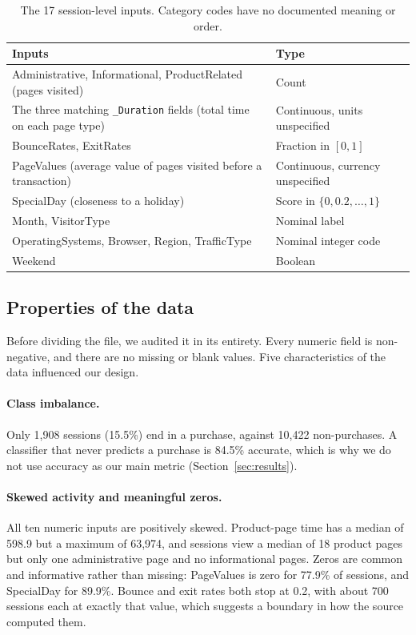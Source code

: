 \documentclass[11pt]{article}
\begin{document}
\begin{table}[t]
  \centering
  \small
  \begin{tabular}{>{\raggedright\arraybackslash}p{}>{\raggedright\arraybackslash}p{}}
    \hline
    \textbf{Inputs} & \textbf{Type} \\
    \hline
    Administrative, Informational, ProductRelated (pages visited) & Count \\
    The three matching \texttt{\_Duration} fields (total time on each page type) & Continuous, units unspecified \\
    BounceRates, ExitRates & Fraction in $[0,1]$ \\
    PageValues (average value of pages visited before a transaction) & Continuous, currency unspecified \\
    SpecialDay (closeness to a holiday) & Score in $\{0, 0.2, \dots, 1\}$ \\
    Month, VisitorType & Nominal label \\
    OperatingSystems, Browser, Region, TrafficType & Nominal integer code \\
    Weekend & Boolean \\
    \hline
  \end{tabular}
  \caption{\label{tab:features}
    The 17 session-level inputs. Category codes have no documented meaning
    or order.}
\end{table}

\subsection{Properties of the data}

Before dividing the file, we audited it in its entirety. Every numeric field is non-negative, and there are no missing or blank values. Five characteristics of the data influenced our design.

\paragraph{Class imbalance.} Only 1,908 sessions (15.5\%) end in a purchase,
against 10,422 non-purchases. A classifier that never predicts a purchase is
84.5\% accurate, which is why we do not use accuracy as our main metric
(Section~\ref{sec:results}).

\paragraph{Skewed activity and meaningful zeros.} All ten numeric inputs are
positively skewed. Product-page time has a median of 598.9 but a maximum of
63,974, and sessions view a median of 18 product pages but only one
administrative page and no informational pages. Zeros are common and
informative rather than missing: PageValues is zero for 77.9\% of sessions,
and SpecialDay for 89.9\%. Bounce and exit rates both stop at 0.2, with about
700 sessions each at exactly that value, which suggests a boundary in how the
source computed them.
\end{document}
